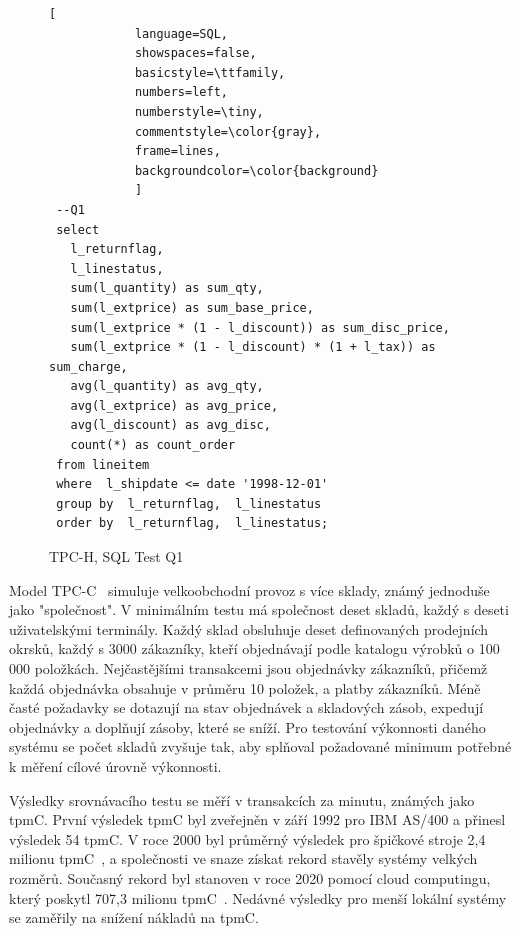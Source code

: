 \documentclass[czech,master,dept460,male,csharp,cpdeclaration]{diploma}
\begin{document}
	\begin{figure}[h]
		\centering
		\begin{lstlisting}[
			language=SQL,
			showspaces=false,
			basicstyle=\ttfamily,
			numbers=left,
			numberstyle=\tiny,
			commentstyle=\color{gray},
			frame=lines,
			backgroundcolor=\color{background}
			]
 --Q1
 select
   l_returnflag,
   l_linestatus,
   sum(l_quantity) as sum_qty,
   sum(l_extprice) as sum_base_price,
   sum(l_extprice * (1 - l_discount)) as sum_disc_price,
   sum(l_extprice * (1 - l_discount) * (1 + l_tax)) as sum_charge,
   avg(l_quantity) as avg_qty,
   avg(l_extprice) as avg_price,
   avg(l_discount) as avg_disc,
   count(*) as count_order
 from lineitem
 where  l_shipdate <= date '1998-12-01'
 group by  l_returnflag,  l_linestatus
 order by  l_returnflag,  l_linestatus;
		\end{lstlisting}
		\caption{TPC-H, SQL Test Q1~\cite{tpc-h-sql, tpc-h-index}
			\label{tpc-h-sql}}
	\end{figure}
	
	Model TPC-C~\cite{tpc-c} simuluje velkoobchodní provoz s více sklady, známý jednoduše jako "společnost". V minimálním testu má společnost deset skladů, každý s deseti uživatelskými terminály. Každý sklad obsluhuje deset definovaných prodejních okrsků, každý s 3000 zákazníky, kteří objednávají podle katalogu výrobků o 100 000 položkách. Nejčastějšími transakcemi jsou objednávky zákazníků, přičemž každá objednávka obsahuje v průměru 10 položek, a platby zákazníků. Méně časté požadavky se dotazují na stav objednávek a skladových zásob, expedují objednávky a doplňují zásoby, které se sníží. Pro testování výkonnosti daného systému se počet skladů zvyšuje tak, aby splňoval požadované minimum potřebné k měření cílové úrovně výkonnosti.
	
	Výsledky srovnávacího testu se měří v transakcích za minutu, známých jako tpmC. První výsledek tpmC byl zveřejněn v září 1992 pro IBM AS/400 a přinesl výsledek 54 tpmC. V roce 2000 byl průměrný výsledek pro špičkové stroje 2,4 milionu tpmC~\cite{tpc-rec-2000}, a společnosti ve snaze získat rekord stavěly systémy velkých rozměrů. Současný rekord byl stanoven v roce 2020 pomocí cloud computingu, který poskytl 707,3 milionu tpmC~\cite{tpc-c-top-result}. Nedávné výsledky pro menší lokální systémy se zaměřily na snížení nákladů na tpmC.
	
\end{document}
